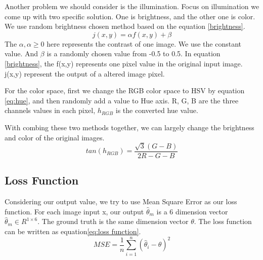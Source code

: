 \documentclass[senior]{IPSstyle}
\begin{document}
Another problem we should consider is the illumination.
Focus on illumination we come up with two specific solution.
One is brightness, and the other one is color.
We use random brightness chosen method based on the equation \ref{brightness}.
\begin{equation}\label{brightness}
    j(x, y) = \alpha f(x, y) + \beta
\end{equation}
The $\alpha, \alpha \geq 0$ here represents the contrast of one image.
We use the constant value.
And $\beta$ is a randomly chosen value from -0.5 to 0.5.
In equation \ref{brightness}, the f(x,y) represents one pixel value in the original input image.
j(x,y) represent the output of a altered image pixel.

For the color space, first we change the RGB color space to HSV by equation \ref{eq:hue}, and then randomly add a value to Hue axis.
R, G, B are the three channels values in each pixel, $h_{RGB}$ is the converted hue value.

With combing these two methods together, we can largely change the brightness and color of the original images. 
\begin{equation}\label{eq:hue}
    tan(h_{RGB}) = \frac{\sqrt{3}(G-B)}{2R-G-B}
\end{equation}

\subsection{Loss Function}
Considering our output value, we try to use Mean Square Error as our loss function.
For each image input x, our output $\hat{\theta}_m$ is a 6 dimension vector $\hat{\theta}_m\in R^{1\times 6}$.
The ground truth is the same dimension vector $\theta$.
The loss function can be written as equation\ref{eq:loss function}.
\begin{equation}\label{eq:loss function}
    MSE=\frac{1}{n}\sum_{i=1}^n (\hat{\theta}_i - \theta)^2
\end{equation}


\end{document}
